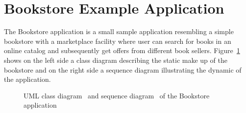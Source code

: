 \section{Bookstore Example Application}\label{sec:example:bookstore}

The Bookstore application is a small sample application resembling a simple bookstore with a marketplace facility where user can search for books in an online catalog and subsequently get offers from different book sellers. Figure~\ref{fig:bookstore:classAndSequenceDiagrams} shows on the left side a class diagram describing the static make up of the bookstore and on the right side a sequence diagram illustrating the dynamic of the application. 

\begin{figure}[h]\centering
{}%
\caption{UML class diagram~ and %
sequence diagram~ of the Bookstore application}
\label{fig:bookstore:classAndSequenceDiagrams}
\end{figure}

